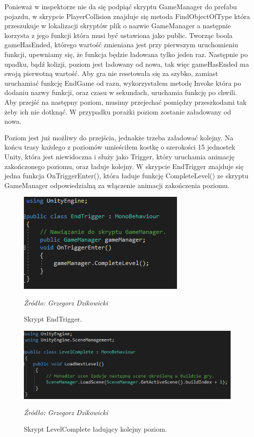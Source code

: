\indent Ponieważ w inspektorze nie da się podpiąć skryptu GameManager do prefabu pojazdu, w skrypcie PlayerCollision znajduje się metoda FindObjectOfType która przeszukuje w lokalizacji skryptów plik o nazwie GameManager a następnie korzysta z jego funkcji która musi być ustawiona jako public. Tworząc boola gameHasEnded, którego wartość zmieniana jest przy pierwszym uruchomieniu funkcji, upewniamy się, że funkcja będzie ładowana tylko jeden raz. Następnie po upadku, bądź kolizji, poziom jest ładowany od nowa, tak więc gameHasEnded ma swoją pierwotną wartość. Aby gra nie resetowała się za szybko, zamiast uruchamiać funkcję EndGame od razu, wykorzystałem metodę Invoke która po dodaniu nazwy funkcji, oraz czasu w sekundach, uruchamia funkcję po chwili. Aby przejść na następny poziom, musimy przejechać pomiędzy przeszkodami tak żeby ich nie dotknąć. W przypadku porażki poziom zostanie załadowany od nowa.

\indent Poziom jest już możliwy do przejścia, jednakże trzeba załadować kolejny. Na końcu trasy każdego z poziomów umieściłem kostkę o szerokości 15 jednostek Unity, która jest niewidoczna i służy jako Trigger, który uruchamia animację zakończonego poziomu, oraz ładuje kolejny. W skrypcie EndTrigger znajduje się jedna funkcja OnTriggerEnter(), która ładuje funkcję CompleteLevel() ze skryptu GameManager odpowiedzialną za włączenie animacji zakończenia poziomu.

\begin{figure}[!ht]
\centering
  \includegraphics[width=1\linewidth]{endtrigger.png}
  \caption{Skrypt EndTrigger.}\label{rys_7}
  \begin{minipage}[t]{0.75\linewidth}
    \emph{Źródło: Grzegorz Dzikowicki}
  \end{minipage}
\end{figure}

\begin{figure}[!ht]
\centering
  \includegraphics[width=1\linewidth]{loadlevel.png}
  \caption{Skrypt LevelComplete ładujący kolejny poziom.}\label{rys_8}
  \begin{minipage}[t]{0.75\linewidth}
    \emph{Źródło: Grzegorz Dzikowicki}
  \end{minipage}
\end{figure}


